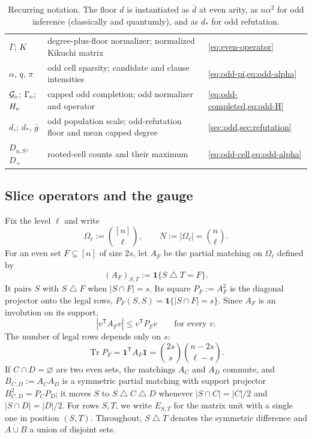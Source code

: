 \documentclass[11pt]{article}
\theoremstyle{definition}
\theoremstyle{remark}
\newcommand{\1}{\mathbf 1}
\newcommand{\cG}{\mathcal G}
\newcommand{\sd}{\mathbin{\triangle}}
\newcommand{\bd}{\bar d}
\DeclareMathOperator{\Tr}{Tr}
\numberwithin{equation}{section}
\begin{document}
\begin{table}[t]
\begin{tabular}{@{}lll@{}}
$\Gamma$; $K$ & degree-plus-floor normalizer; normalized Kikuchi matrix & \cref{eq:even-operator}\\
$\alpha$, $q$, $\pi$ & odd cell sparsity; candidate and clause intensities & \cref{eq:odd-pi,eq:odd-alpha}\\
$\cG_{\rm o}$; $\Gamma_{\rm o}$; $H_{\rm o}$ & capped odd completion; odd normalizer and operator & \cref{eq:odd-completed,eq:odd-H}\\
$d_\circ$; $d_*$, $\bar g$ & odd population scale; odd-refutation floor and mean capped degree & \cref{sec:odd,sec:refutation}\\
$D_{u,S}$, $D_+$ & rooted-cell counts and their maximum & \cref{eq:odd-cell,eq:odd-alpha}\\
\bottomrule
\end{tabular}
\caption{Recurring notation.  The floor $d$ is instantiated as $\bd$ at
even arity, as $n\alpha^2$ for odd inference (classically and
quantumly), and as $d_*$ for odd refutation.}
\label{tab:notation}
\end{table}

\subsection{Slice operators and the gauge}\label{sec:slice}

Fix the level $\ell$ and write
\[
 \Omega_\ell:=\binom{[n]}\ell,
 \qquad N:=|\Omega_\ell|=\binom n\ell.
\]
For an even set $F\subseteq[n]$ of size $2s$, let $A_F$ be the partial
matching on $\Omega_\ell$ defined by
\begin{equation}\label{eq:matching}
 (A_F)_{S,T}:=\1\{S\sd T=F\}.
\end{equation}
It pairs $S$ with $S\sd F$ when $|S\cap F|=s$.  Its square $P_F:=A_F^2$ is
the diagonal projector onto the legal rows,
$P_F(S,S)=\1\{|S\cap F|=s\}$.  Since $A_F$ is an involution on its support,
\begin{equation}\label{eq:domination}
 |v^{\mathsf T}A_Fv|\le v^{\mathsf T}P_Fv
 \qquad\text{for every }v.
\end{equation}
The number of legal rows depends only on $s$:
\begin{equation}\label{eq:support-count}
 \Tr P_F=\1^{\mathsf T}A_F\1
 =\binom{2s}s\binom{n-2s}{\ell-s}.
\end{equation}
If $C\cap D=\varnothing$ are two even sets, the matchings $A_C$ and $A_D$
commute, and $B_{C,D}:=A_CA_D$ is a symmetric partial matching with support
projector $B_{C,D}^2=P_CP_D$; it moves $S$ to $S\sd C\sd D$ whenever
$|S\cap C|=|C|/2$ and $|S\cap D|=|D|/2$.  For rows $S,T$, we write
$E_{S,T}$ for the matrix unit with a single one in position $(S,T)$.
Throughout, $S\sd T$ denotes the symmetric difference and
$A\mathbin{\dot\cup}B$ a union of disjoint sets.
\end{document}
